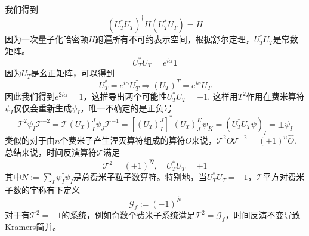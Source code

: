 \documentclass[a4paper]{article}
\numberwithin{equation}{subsection}
\newcommand{\mT}{\mathcal{T}}
\begin{document}
我们得到
\begin{equation}
    (U_T^*U_T)^\dagger H(U_T^*U_T)=H
\end{equation}
因为一次量子化哈密顿$H$跑遍所有不可约表示空间，根据舒尔定理，$U_T^* U_T$是常数矩阵。
\begin{equation}
    U_T^*U_T=e^{i\alpha}\mathbf{1}
\end{equation}
因为$U_T$是幺正矩阵，可以得到
\begin{equation}
    U_T^*=e^{i\alpha}U_T^\dagger\Rightarrow (U_T)^T=e^{i\alpha}U_T
\end{equation}
因此我们得到$e^{2i\alpha}=1$，这推导出两个可能性$U_T^*U_T=\pm 1$. 这样用$T^2$作用在费米算符$\psi_I$仅仅会重新生成$\psi_I$，唯一不确定的是正负号
\begin{equation}
    \mT^2\psi_I\mT^{-2}=\mT (U_T)_I^J \psi_J\mT^{-1}=[(U_T)_I^J]^*(U_T)_J^K\psi_K=(U_T^*U_T\psi)_I=\pm\psi_I
\end{equation}
类似的对于由$n$个费米子产生湮灭算符组成的算符$O$来说，$\mT^2\hat{O}\mT^{-2}=(\pm 1)^n\hat{O}$. 总结来说，时间反演算符$\mT$满足
\begin{equation}
    \mT^2=(\pm 1)^{\hat{N}},\quad U_T^*U_T=\pm 1
\end{equation}
其中$N:=\sum_I\psi_I^\dagger\psi_I$是总费米子粒子数算符。特别地，当$U_T^*U_T=-1$，$\mT$平方对费米子数的宇称有下定义
\begin{equation}
    \mathcal{G}_f:=(-1)^{\hat{N}}
\end{equation}
对于有$\mT^2=-1$的系统，例如奇数个费米子系统满足$\mT^2=\mathcal{G}_f$，时间反演不变导致Kramers简并。
\end{document}

